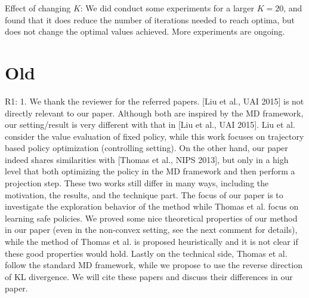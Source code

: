 \documentclass{article}
\begin{document}
Effect of changing $K$:
We did conduct some experiments for a larger $K = 20$, and found that it does
reduce the number of iterations needed to reach optima,
but does not change the optimal values achieved.
More experiments are ongoing.

\newpage

\section{Old}

R1: 
1. We thank the reviewer for the referred papers. [Liu et al., UAI 2015] is not directly relevant to our paper. Although both are inspired by the MD framework,
our setting/result is very different with that in [Liu et al., UAI 2015]. Liu et al. consider the value evaluation of fixed policy, while this work focuses on trajectory based policy optimization (controlling setting). On the other hand, our paper indeed shares similarities with [Thomas et al., NIPS 2013], but only in a high level that both optimizing the policy in the MD framework and then perform a projection step. These two works still differ in many ways, including the motivation, the results, and the technique part. The focus of our paper is to investigate the exploration behavior of the method while Thomas et al. focus on learning safe policies. We proved some nice theoretical properties of our method in our paper (even in the non-convex setting, see the next comment for details), while the method of Thomas et al. is proposed heuristically and it is not clear if these good properties would hold. Lastly on the technical side, Thomas et al. follow the standard MD framework, while we propose to use the reverse direction of KL divergence. We will cite these papers and discuss their differences in our paper.
\end{document}
